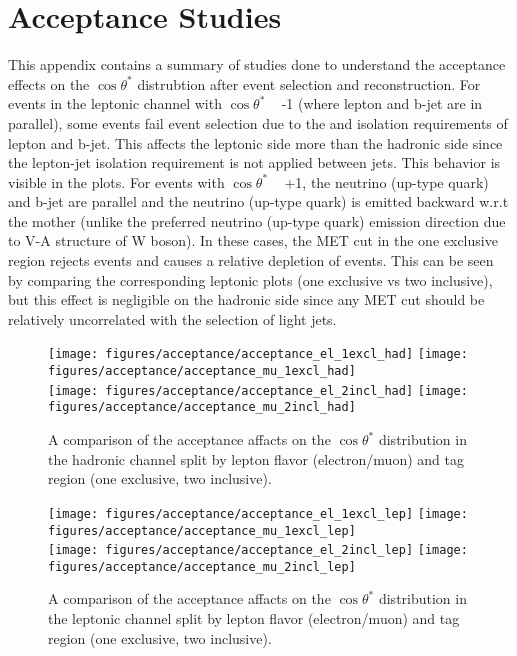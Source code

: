 \clearpage
\section{Acceptance Studies}
\label{app:acceptanceStudies}
This appendix contains a summary of studies done to understand the acceptance effects on the $\cos\theta^*$ distrubtion after event selection and reconstruction. For events in the leptonic channel with $\cos\theta^*$ ~ -1 (where lepton and b-jet are in parallel), some events fail event selection due to the \pt and isolation requirements of lepton and b-jet. This affects the leptonic side more than the hadronic side since the lepton-jet isolation requirement is not applied between jets. This behavior is visible in the plots. For events with $\cos\theta^*$ ~ +1, the neutrino (up-type quark) and b-jet are parallel and the neutrino (up-type quark) is emitted backward w.r.t the mother \w (unlike the preferred neutrino (up-type quark) emission direction due to V-A structure of W boson). In these cases, the MET cut in the one exclusive region rejects events and causes a relative depletion of events. This can be seen by comparing the corresponding leptonic plots (one exclusive vs two inclusive), but this effect is negligible on the hadronic side since any MET cut should be relatively uncorrelated with the selection of light jets.


\begin{figure}[htbp]
\begin{center}
		\texttt{[image: figures/acceptance/acceptance\_el\_1excl\_had]}
		\texttt{[image: figures/acceptance/acceptance\_mu\_1excl\_had]}\\
		\texttt{[image: figures/acceptance/acceptance\_el\_2incl\_had]}
		\texttt{[image: figures/acceptance/acceptance\_mu\_2incl\_had]}
	\caption{A comparison of the acceptance affacts on the $\cos\theta^*$ distribution in the hadronic channel split by lepton flavor (electron/muon) and \bt tag region (one exclusive, two inclusive).}
	\label{fig:powhegVprotos_el_truth}
\end{center}	
\end{figure}

\begin{figure}[htbp]
\begin{center}
		\texttt{[image: figures/acceptance/acceptance\_el\_1excl\_lep]}
		\texttt{[image: figures/acceptance/acceptance\_mu\_1excl\_lep]}\\
		\texttt{[image: figures/acceptance/acceptance\_el\_2incl\_lep]}
		\texttt{[image: figures/acceptance/acceptance\_mu\_2incl\_lep]}
	\caption{A comparison of the acceptance affacts on the $\cos\theta^*$ distribution in the leptonic channel split by lepton flavor (electron/muon) and \bt tag region (one exclusive, two inclusive).}
	\label{fig:powhegVprotos_mu_truth}
\end{center}	
\end{figure}

